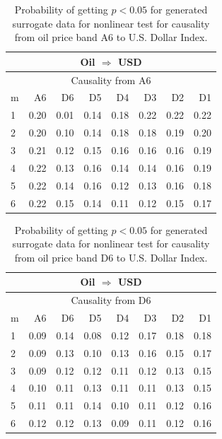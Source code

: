%
%
\begin{table}[H]
\begin{center}
\begin{tabular}{l|r r r r r r r}
\hline\hline
\multicolumn{8}{c}{Oil $\Rightarrow$ USD}\\
\hline
\multicolumn{8}{c}{Causality from A6}\\
\hline\hline
m & A6 & D6 & D5 & D4 & D3 & D2 & D1 \\
\hline
1 & 0.20 & 0.01 & 0.14 & 0.18 & 0.22 & 0.22 & 0.22 \\
2 & 0.20 & 0.10 & 0.14 & 0.18 & 0.18 & 0.19 & 0.20 \\
3 & 0.21 & 0.12 & 0.15 & 0.16 & 0.16 & 0.16 & 0.19 \\
4 & 0.22 & 0.13 & 0.16 & 0.14 & 0.14 & 0.16 & 0.19 \\
5 & 0.22 & 0.14 & 0.16 & 0.12 & 0.13 & 0.16 & 0.18 \\
6 & 0.22 & 0.15 & 0.14 & 0.11 & 0.12 & 0.15 & 0.17 \\
\hline\hline
\end{tabular}
\caption{Probability of getting $p < 0.05$ for generated surrogate data for nonlinear test for causality from oil price band A6 to U.S. Dollar Index.}
\end{center}
\end{table}

%
%
\begin{table}[H]
\begin{center}
\begin{tabular}{l|r r r r r r r}
\hline\hline
\multicolumn{8}{c}{Oil $\Rightarrow$ USD}\\
\hline
\multicolumn{8}{c}{Causality from D6}\\
\hline\hline
m & A6 & D6 & D5 & D4 & D3 & D2 & D1 \\
\hline
1 & 0.09 & 0.14 & 0.08 & 0.12 & 0.17 & 0.18 & 0.18 \\
2 & 0.09 & 0.13 & 0.10 & 0.13 & 0.16 & 0.15 & 0.17 \\
3 & 0.09 & 0.12 & 0.12 & 0.11 & 0.12 & 0.13 & 0.15 \\
4 & 0.10 & 0.11 & 0.13 & 0.11 & 0.11 & 0.13 & 0.15 \\
5 & 0.11 & 0.11 & 0.14 & 0.10 & 0.11 & 0.12 & 0.16 \\
6 & 0.12 & 0.12 & 0.13 & 0.09 & 0.11 & 0.12 & 0.16 \\
\hline\hline
\end{tabular}
\caption{Probability of getting $p < 0.05$ for generated surrogate data for nonlinear test for causality from oil price band D6 to U.S. Dollar Index.}
\end{center}
\end{table}

